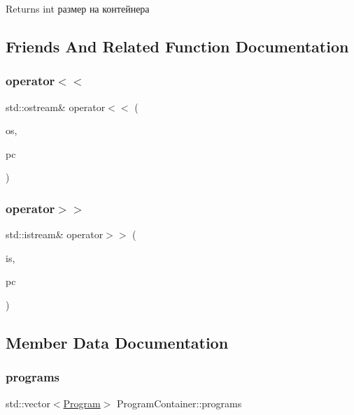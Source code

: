 \begin{DoxyReturn}{Returns}
int размер на контейнера 
\end{DoxyReturn}


\subsection{Friends And Related Function Documentation}
\mbox{\label{class_program_container_a31b13ec661243c3ed004670c91e584c7}} 
\subsubsection{\texorpdfstring{operator$<$$<$}{operator<<}}
{\footnotesize\ttfamily std\+::ostream\& operator$<$$<$ (\begin{DoxyParamCaption}\item[{std\+::ostream \&}]{os,  }\item[{const \hyperlink{class_program_container}{Program\+Container} \&}]{pc }\end{DoxyParamCaption})\hspace{0.3cm}{\ttfamily [friend]}}

\mbox{\label{class_program_container_aa1143040c52e764c64a503d1b09fe8d2}} 
\subsubsection{\texorpdfstring{operator$>$$>$}{operator>>}}
{\footnotesize\ttfamily std\+::istream\& operator$>$$>$ (\begin{DoxyParamCaption}\item[{std\+::istream \&}]{is,  }\item[{\hyperlink{class_program_container}{Program\+Container} \&}]{pc }\end{DoxyParamCaption})\hspace{0.3cm}{\ttfamily [friend]}}



\subsection{Member Data Documentation}
\mbox{\label{class_program_container_a48acf6026a06116cff5ad8ec86e7a6ce}} 
\subsubsection{\texorpdfstring{programs}{programs}}
{\footnotesize\ttfamily std\+::vector$<$\hyperlink{class_program}{Program}$>$ Program\+Container\+::programs\hspace{0.3cm}{\ttfamily [private]}}

